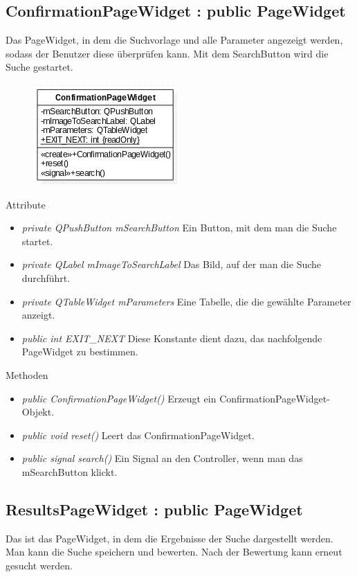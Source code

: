 \subsection*{ConfirmationPageWidget : public PageWidget}
Das PageWidget, in dem die Suchvorlage und alle Parameter angezeigt werden, sodass der Benutzer diese überprüfen kann. Mit dem SearchButton wird die Suche gestartet.

\begin{figure}[H]
	\centering
	\includegraphics[scale=0.5]{img/Klassendiagramm/Klassen/View/ConfirmationPageWidget}
	\label{fig:confirmationPageWidget}
\end{figure}

Attribute
\begin{itemize}
	\item\textit{private QPushButton mSearchButton}
	Ein Button, mit dem man die Suche startet.
	\item\textit{private QLabel mImageToSearchLabel}
	Das Bild, auf der man die Suche durchführt.
	\item\textit{private QTableWidget mParameters}
	Eine Tabelle, die die gewählte Parameter anzeigt.
	\item\textit{public int EXIT\_NEXT} 
	Diese Konstante dient dazu, das nachfolgende PageWidget zu bestimmen. 
\end{itemize}

Methoden
\begin{itemize}
	\item\textit{public ConfirmationPageWidget()}
	Erzeugt ein ConfirmationPageWidget-Objekt.
	\item\textit{public void reset()}
	Leert das ConfirmationPageWidget. 
	\item\textit{public signal search()}
	Ein Signal an den Controller, wenn man das mSearchButton klickt.
\end{itemize}

\subsection*{ResultsPageWidget : public PageWidget}
Das ist das PageWidget, in dem die Ergebnisse der Suche dargestellt werden. Man kann die Suche speichern und bewerten. Nach der Bewertung kann erneut gesucht werden.

